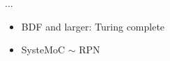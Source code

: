 \begin{frame}
  ...
\end{frame}










\begin{frame}
\begin{figure}
\centering
\resizebox{0.7\columnwidth}{!}{}
\end{figure}
\begin{itemize}
\item BDF and larger: Turing complete
\item SysteMoC $\sim$ RPN
\end{itemize}
\end{frame}

